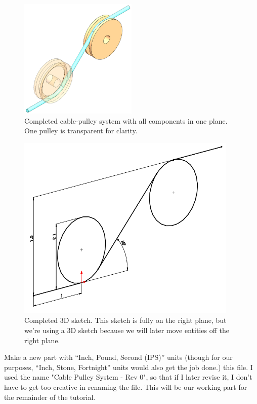 \begin{figure}[H]
\begin{center}
  \includegraphics[height=2.25in]{images/figures/completed-planar.png}
\end{center}
\caption{Completed cable-pulley system with all components in one plane. One pulley is
transparent for clarity. \label{fig:completed-planar}}

\end{figure}

\begin{figure}[H]
\begin{center}
\includegraphics[height=3.5in]{images/figures/completed-planar-3d-sketch.png}
\end{center}
\caption{Completed 3D sketch. This sketch is fully on the right plane, but we're using
a 3D sketch because we will later move entities off the right plane.
\label{fig:completed-planar-3d-sketch}}
\end{figure}

Make a new part with ``Inch, Pound, Second (IPS)'' units (though for our purposes,
``Inch, Stone, Fortnight'' units would also get the job done.) 
this file. I used the name "Cable Pulley System - Rev 0", so that if I later
revise it, I don't have to get too creative in renaming the file. This
will be our working part for the remainder of the tutorial.

